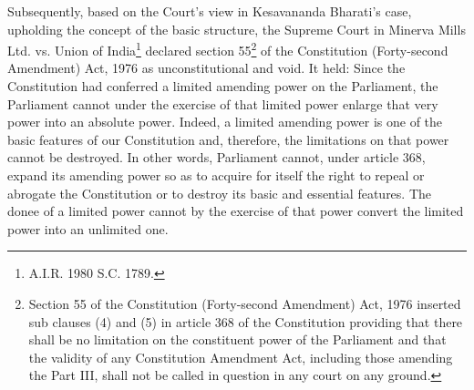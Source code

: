 \begin{multicols}{2}
\noi
Subsequently, based on the Court’s view in Kesavananda Bharati’s case, upholding the
concept of the basic structure, the Supreme Court in Minerva Mills Ltd. vs. Union of India\footnote{A.I.R. 1980 S.C. 1789.}
declared section 55\footnote{Section 55 of the Constitution (Forty-second Amendment) Act, 1976 inserted sub clauses (4) and (5) in article 368 of the Constitution providing that there shall be no limitation on the constituent power of the Parliament and
that the validity of any Constitution Amendment Act, including those amending the Part III, shall not be called in
question in any court on any ground.} of the Constitution (Forty-second Amendment) Act, 1976 as
unconstitutional and void. It held: Since the Constitution had conferred a limited amending
power on the Parliament, the Parliament cannot under the exercise of that limited power
enlarge that very power into an absolute power. Indeed, a limited amending power is one of
the basic features of our Constitution and, therefore, the limitations on that power cannot be
destroyed. In other words, Parliament cannot, under article 368, expand its amending power
so as to acquire for itself the right to repeal or abrogate the Constitution or to destroy its basic
and essential features. The donee of a limited power cannot by the exercise of that power
convert the limited power into an unlimited one.


\end{multicols}
